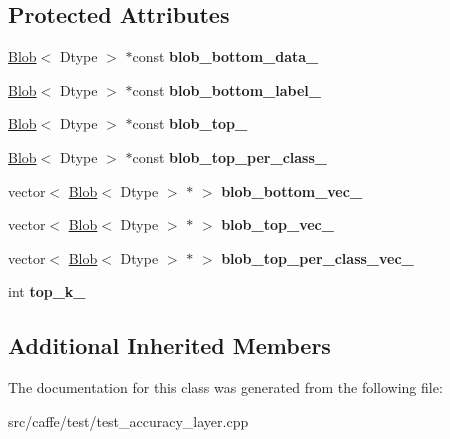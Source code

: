 \subsection*{Protected Attributes}
\begin{DoxyCompactItemize}
\item 
\mbox{\label{classcaffe_1_1_accuracy_layer_test_af399b929ca86558895d62c68b0dc8c49}} 
\mbox{\hyperlink{classcaffe_1_1_blob}{Blob}}$<$ Dtype $>$ $\ast$const {\bfseries blob\+\_\+bottom\+\_\+data\+\_\+}
\item 
\mbox{\label{classcaffe_1_1_accuracy_layer_test_a37a8484fffa29f6ed07fd2b6d9755e5b}} 
\mbox{\hyperlink{classcaffe_1_1_blob}{Blob}}$<$ Dtype $>$ $\ast$const {\bfseries blob\+\_\+bottom\+\_\+label\+\_\+}
\item 
\mbox{\label{classcaffe_1_1_accuracy_layer_test_a0efe92c5ee1d7911d11d1b909afb4bd0}} 
\mbox{\hyperlink{classcaffe_1_1_blob}{Blob}}$<$ Dtype $>$ $\ast$const {\bfseries blob\+\_\+top\+\_\+}
\item 
\mbox{\label{classcaffe_1_1_accuracy_layer_test_a73dc5bcbbd41a5dad5f9a6c7dfd495ac}} 
\mbox{\hyperlink{classcaffe_1_1_blob}{Blob}}$<$ Dtype $>$ $\ast$const {\bfseries blob\+\_\+top\+\_\+per\+\_\+class\+\_\+}
\item 
\mbox{\label{classcaffe_1_1_accuracy_layer_test_a0758cd929b32853d47093d874249fd76}} 
vector$<$ \mbox{\hyperlink{classcaffe_1_1_blob}{Blob}}$<$ Dtype $>$ $\ast$ $>$ {\bfseries blob\+\_\+bottom\+\_\+vec\+\_\+}
\item 
\mbox{\label{classcaffe_1_1_accuracy_layer_test_a0e5fdcee8912189dc24e9c611dfa2e49}} 
vector$<$ \mbox{\hyperlink{classcaffe_1_1_blob}{Blob}}$<$ Dtype $>$ $\ast$ $>$ {\bfseries blob\+\_\+top\+\_\+vec\+\_\+}
\item 
\mbox{\label{classcaffe_1_1_accuracy_layer_test_af35a94a6056c736ea7b15ec735497f71}} 
vector$<$ \mbox{\hyperlink{classcaffe_1_1_blob}{Blob}}$<$ Dtype $>$ $\ast$ $>$ {\bfseries blob\+\_\+top\+\_\+per\+\_\+class\+\_\+vec\+\_\+}
\item 
\mbox{\label{classcaffe_1_1_accuracy_layer_test_a0581566a8f94f64752e24faa4043095e}} 
int {\bfseries top\+\_\+k\+\_\+}
\end{DoxyCompactItemize}
\subsection*{Additional Inherited Members}


The documentation for this class was generated from the following file\+:\begin{DoxyCompactItemize}
\item 
src/caffe/test/test\+\_\+accuracy\+\_\+layer.\+cpp\end{DoxyCompactItemize}
